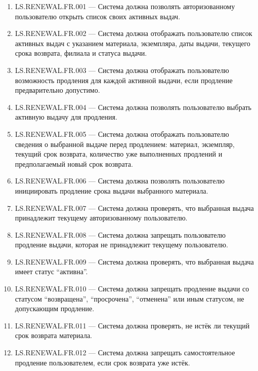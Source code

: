 \documentclass[12pt,a4paper]{article}
\begin{document}
	\begin{enumerate}
		\item LS.RENEWAL.FR.001 --- Система должна позволять авторизованному пользователю
		открыть список своих активных выдач.
		
		\item LS.RENEWAL.FR.002 --- Система должна отображать пользователю список активных
		выдач с указанием материала, экземпляра, даты выдачи, текущего срока возврата,
		филиала и статуса выдачи.
		
		\item LS.RENEWAL.FR.003 --- Система должна отображать пользователю возможность
		продления для каждой активной выдачи, если продление предварительно допустимо.
		
		\item LS.RENEWAL.FR.004 --- Система должна позволять пользователю выбрать активную
		выдачу для продления.
		
		\item LS.RENEWAL.FR.005 --- Система должна отображать пользователю сведения
		о выбранной выдаче перед продлением: материал, экземпляр, текущий срок возврата,
		количество уже выполненных продлений и предполагаемый новый срок возврата.
		
		\item LS.RENEWAL.FR.006 --- Система должна позволять пользователю инициировать
		продление срока выдачи выбранного материала.
		
		\item LS.RENEWAL.FR.007 --- Система должна проверять, что выбранная выдача принадлежит
		текущему авторизованному пользователю.
		
		\item LS.RENEWAL.FR.008 --- Система должна запрещать пользователю продление выдачи,
		которая не принадлежит текущему пользователю.
		
		\item LS.RENEWAL.FR.009 --- Система должна проверять, что выбранная выдача имеет
		статус ``активна''.
		
		\item LS.RENEWAL.FR.010 --- Система должна запрещать продление выдачи со статусом
		``возвращена'', ``просрочена'', ``отменена'' или иным статусом, не допускающим
		продление.
		
		\item LS.RENEWAL.FR.011 --- Система должна проверять, не истёк ли текущий срок
		возврата материала.
		
		\item LS.RENEWAL.FR.012 --- Система должна запрещать самостоятельное продление
		пользователем, если срок возврата уже истёк.
		

\end{enumerate}
\end{document}

